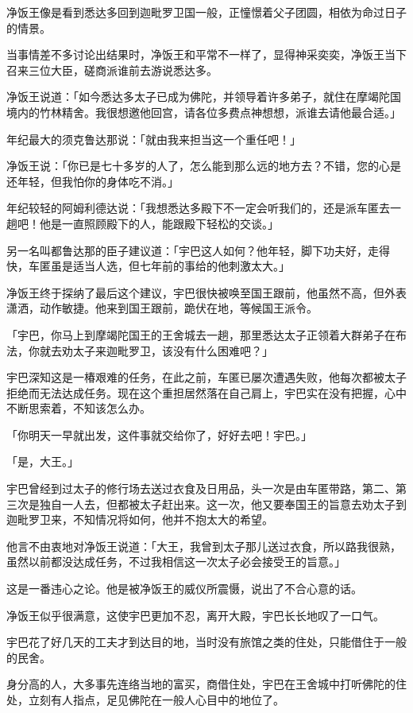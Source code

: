 \documentclass[twoside,openany]{book}
\begin{document}
净饭王像是看到悉达多回到迦毗罗卫国一般，正憧憬着父子团圆，相依为命过日子的情景。

当事情差不多讨论出结果时，净饭王和平常不一样了，显得神采奕奕，净饭王当下召来三位大臣，磋商派谁前去游说悉达多。

净饭王说道：「如今悉达多太子已成为佛陀，并领导着许多弟子，就住在摩竭陀国境内的竹林精舍。我很想邀他回宫，请各位多费点神想想，派谁去请他最合适。」

年纪最大的须克鲁达那说：「就由我来担当这一个重任吧！」

净饭王说：「你已是七十多岁的人了，怎么能到那么远的地方去？不错，您的心是还年轻，但我怕你的身体吃不消。」

年纪较轻的阿姆利德达说：「我想悉达多殿下不一定会听我们的，还是派车匿去一趟吧！他是一直照顾殿下的人，能跟殿下轻松的交谈。」

另一名叫都鲁达那的臣子建议道：「宇巴这人如何？他年轻，脚下功夫好，走得快，车匿虽是适当人选，但七年前的事给的他刺激太大。」

净饭王终于探纳了最后这个建议，宇巴很快被唤至国王跟前，他虽然不高，但外表潇洒，动作敏捷。他来到国王跟前，跪伏在地，等候国王派令。

「宇巴，你马上到摩竭陀国王的王舍城去一趟，那里悉达太子正领着大群弟子在布法，你就去劝太子来迦毗罗卫，该没有什么困难吧？」

宇巴深知这是一椿艰难的任务，在此之前，车匿已屡次遭遇失败，他每次都被太子拒绝而无法达成任务。现在这个重担居然落在自己肩上，宇巴实在没有把握，心中不断思索着，不知该怎么办。

「你明天一早就出发，这件事就交给你了，好好去吧！宇巴。」

「是，大王。」

宇巴曾经到过太子的修行场去送过衣食及日用品，头一次是由车匿带路，第二、第三次是独自一人去，但都被太子赶出来。这一次，他又要奉国王的旨意去劝太子到迦毗罗卫来，不知情况将如何，他并不抱太大的希望。

他言不由衷地对净饭王说道：「大王，我曾到太子那儿送过衣食，所以路我很熟，虽然以前都没达成任务，不过我相信这一次太子必会接受王的旨意。」

这是一番违心之论。他是被净饭王的威仪所震慑，说出了不合心意的话。

净饭王似乎很满意，这使宇巴更加不忍，离开大殿，宇巴长长地叹了一口气。

宇巴花了好几天的工夫才到达目的地，当时没有旅馆之类的住处，只能借住于一般的民舍。

身分高的人，大多事先连络当地的富买，商借住处，宇巴在王舍城中打听佛陀的住处，立刻有人指点，足见佛陀在一般人心目中的地位了。
\end{document}
